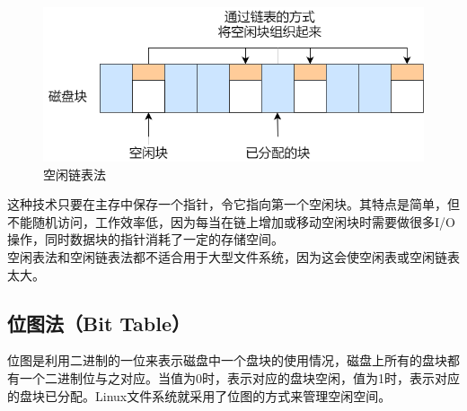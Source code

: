 \begin{figure}[H]
	\centering
	\includegraphics[scale=0.5]{img/C5/5-5/2.png}
	\caption{空闲链表法}
\end{figure}

这种技术只要在主存中保存一个指针，令它指向第一个空闲块。其特点是简单，但不能随机访问，工作效率低，因为每当在链上增加或移动空闲块时需要做很多I/O操作，同时数据块的指针消耗了一定的存储空间。 \\

空闲表法和空闲链表法都不适合用于大型文件系统，因为这会使空闲表或空闲链表太大。

\subsection{位图法（Bit Table）}

位图是利用二进制的一位来表示磁盘中一个盘块的使用情况，磁盘上所有的盘块都有一个二进制位与之对应。当值为0时，表示对应的盘块空闲，值为1时，表示对应的盘块已分配。Linux文件系统就采用了位图的方式来管理空闲空间。